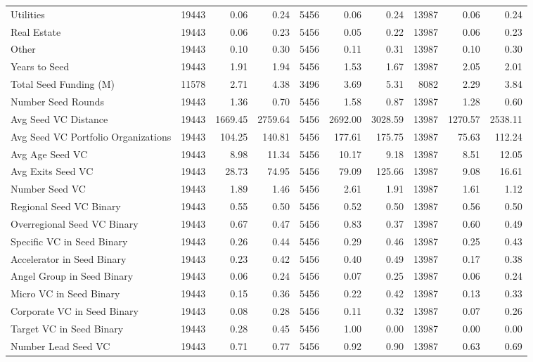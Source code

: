 {\begin{table}[!h]
{\begin{tabular}[t]{lrrrrrrrrr}
Utilities & 19443 & 0.06 & 0.24 & 5456 & 0.06 & 0.24 & 13987 & 0.06 & 0.24\\
Real Estate & 19443 & 0.06 & 0.23 & 5456 & 0.05 & 0.22 & 13987 & 0.06 & 0.23\\
Other & 19443 & 0.10 & 0.30 & 5456 & 0.11 & 0.31 & 13987 & 0.10 & 0.30\\
Years to Seed & 19443 & 1.91 & 1.94 & 5456 & 1.53 & 1.67 & 13987 & 2.05 & 2.01\\
\addlinespace
Total Seed Funding (M) & 11578 & 2.71 & 4.38 & 3496 & 3.69 & 5.31 & 8082 & 2.29 & 3.84\\
Number Seed Rounds & 19443 & 1.36 & 0.70 & 5456 & 1.58 & 0.87 & 13987 & 1.28 & 0.60\\
Avg Seed VC Distance & 19443 & 1669.45 & 2759.64 & 5456 & 2692.00 & 3028.59 & 13987 & 1270.57 & 2538.11\\
Avg Seed VC Portfolio Organizations & 19443 & 104.25 & 140.81 & 5456 & 177.61 & 175.75 & 13987 & 75.63 & 112.24\\
Avg Age Seed VC & 19443 & 8.98 & 11.34 & 5456 & 10.17 & 9.18 & 13987 & 8.51 & 12.05\\
\addlinespace
Avg Exits Seed VC & 19443 & 28.73 & 74.95 & 5456 & 79.09 & 125.66 & 13987 & 9.08 & 16.61\\
Number Seed VC & 19443 & 1.89 & 1.46 & 5456 & 2.61 & 1.91 & 13987 & 1.61 & 1.12\\
Regional Seed VC Binary & 19443 & 0.55 & 0.50 & 5456 & 0.52 & 0.50 & 13987 & 0.56 & 0.50\\
Overregional Seed VC Binary & 19443 & 0.67 & 0.47 & 5456 & 0.83 & 0.37 & 13987 & 0.60 & 0.49\\
Specific VC in Seed Binary & 19443 & 0.26 & 0.44 & 5456 & 0.29 & 0.46 & 13987 & 0.25 & 0.43\\
\addlinespace
Accelerator in Seed Binary & 19443 & 0.23 & 0.42 & 5456 & 0.40 & 0.49 & 13987 & 0.17 & 0.38\\
Angel Group in Seed Binary & 19443 & 0.06 & 0.24 & 5456 & 0.07 & 0.25 & 13987 & 0.06 & 0.24\\
Micro VC in Seed Binary & 19443 & 0.15 & 0.36 & 5456 & 0.22 & 0.42 & 13987 & 0.13 & 0.33\\
Corporate VC in Seed Binary & 19443 & 0.08 & 0.28 & 5456 & 0.11 & 0.32 & 13987 & 0.07 & 0.26\\
Target VC in Seed Binary & 19443 & 0.28 & 0.45 & 5456 & 1.00 & 0.00 & 13987 & 0.00 & 0.00\\
\addlinespace
Number Lead Seed VC & 19443 & 0.71 & 0.77 & 5456 & 0.92 & 0.90 & 13987 & 0.63 & 0.69\\

\end{tabular}}
\end{table}}
